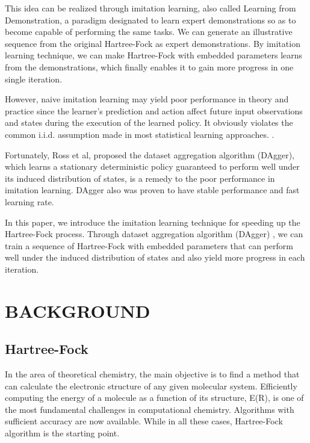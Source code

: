 \documentclass[twoside]{article}
\begin{document}
This idea can be realized through imitation learning, also called Learning from Demonstration, a paradigm designated to learn expert demonstrations so as to become capable of performing the same tasks. 
We can generate an illustrative sequence from the original Hartree-Fock as expert demonstrations. By imitation learning technique, we can make 
Hartree-Fock with embedded parameters learns from the demonstrations,  which finally enables it to gain more progress in one single iteration.


However, naive imitation learning may yield poor performance in theory and practice since the learner's prediction and action affect future input observations and states during the execution of the learned policy. It obviously violates the common i.i.d. assumption made in most statistical learning approaches. \cite{Ross}.


Fortunately, Ross et al,\cite{DAgger} proposed the dataset aggregation algorithm (DAgger), which learns a stationary deterministic policy guaranteed to perform well under its induced distribution of states, is a remedy to the poor performance in imitation learning. DAgger also was proven to have stable performance and fast learning rate. \cite{DAggerCompare}

In this paper,  we introduce the imitation learning technique for speeding up the Hartree-Fock process. 
Through dataset aggregation algorithm (DAgger) \cite{DAgger}, we can train a sequence of Hartree-Fock with embedded parameters that can perform well under the induced distribution of states and also yield more progress in each iteration. 


\section{BACKGROUND}

\subsection{Hartree-Fock}

In the area of theoretical chemistry, the main objective is to find a method that can calculate the electronic structure of any given molecular system. Efficiently computing the energy of a molecule as a function of its structure, E(R), is one of the most fundamental challenges in computational chemistry. Algorithms with sufficient accuracy are now available. While in all these cases, Hartree-Fock algorithm is the starting point.
\end{document}
